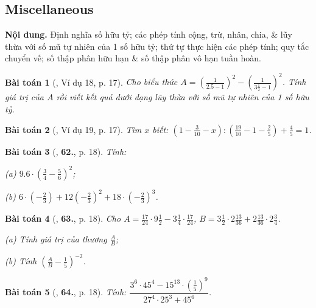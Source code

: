 \documentclass{article}
\numberwithin{equation}{section}
\newtheorem{baitoan}{Bài toán}[section]
\begin{document}
\subsection{Miscellaneous}
\textsf{\textbf{Nội dung.} Định nghĩa số hữu tỷ; các phép tính cộng, trừ, nhân, chia, \& lũy thừa với số mũ tự nhiên của 1 số hữu tỷ; thứ tự thực hiện các phép tính; quy tắc chuyển vế; số thập phân hữu hạn \& số thập phân vô hạn tuần hoàn.}

\begin{baitoan}[\cite{Tuyen_Toan_7}, Ví dụ 18, p. 17]
	Cho biểu thức $A = \left(\frac{1}{2.5  -1}\right)^2 - \left(\frac{1}{3\frac{1}{2} - 1}\right)^2$. Tính giá trị của $A$ rồi viết kết quả dưới dạng lũy thừa với số mũ tự nhiên của 1 số hữu tỷ.
\end{baitoan}

\begin{baitoan}[\cite{Tuyen_Toan_7}, Ví dụ 19, p. 17]
	Tìm $x$ biết: $\left(1 - \frac{3}{10} - x\right):\left(\frac{19}{10} - 1 - \frac{2}{5}\right) + \frac{4}{5} = 1$.
\end{baitoan}

\begin{baitoan}[\cite{Tuyen_Toan_7}, \textbf{62.}, p. 18]
	Tính:
	\begin{enumerate*}
		\item[(a)] $9.6\cdot\left(\frac{3}{4} - \frac{5}{6}\right)^2$;
		\item[(b)] $6\cdot\left(-\frac{2}{3}\right) + 12\left(-\frac{2}{3}\right)^2 + 18\cdot\left(-\frac{2}{3}\right)^3$.
	\end{enumerate*}
\end{baitoan}

\begin{baitoan}[\cite{Tuyen_Toan_7}, \textbf{63.}, p. 18]
	Cho $A = \frac{17}{24}\cdot 9\frac{1}{2} - 3\frac{1}{4}\cdot\frac{17}{24}$, $B = 3\frac{1}{2}\cdot 2\frac{13}{36} + 2\frac{13}{36}\cdot 2\frac{3}{4}$.
	\begin{enumerate*}
		\item[(a)] Tính giá trị của thương $\frac{A}{B}$;
		\item[(b)] Tính $\left(\frac{A}{B} - \frac{1}{5}\right)^{-2}$.
	\end{enumerate*}
\end{baitoan}

\begin{baitoan}[\cite{Tuyen_Toan_7}, \textbf{64.}, p. 18]
	Tính: $\dfrac{3^6\cdot 45^4 - 15^{13}\cdot\left(\frac{1}{5}\right)^9}{27^4\cdot 25^3 + 45^6}$.
\end{baitoan}
	
\end{document}
